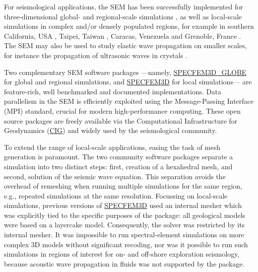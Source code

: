 \documentclass[referee,extra]{gji}
\begin{document}
For seismological applications, the SEM has been successfully implemented for three-dimensional
global- and regional-scale simulations
\citep{KoVi98,PaFaMa99,Ch00,KoTr02a,KoTr02b,CaChViMo03,ChVa04,FiIgBuKe09},
as well as local-scale simulations in complex and/or densely populated regions, for example in southern California, USA \citep{KoLiTrSuStSh04,TaLiMaTr09,TaLiMaTr2010},
Taipei, Taiwan \citep{LeChLiKoHuTr08,LeChKoHuTr09,LeKoHuTr09},
Caracas, Venezuela \citep{DeCuFeVi06}
and Grenoble, France \citep{CCGCK05,StPaIg09,ChMoTsBaKrKaStKr10}.
The SEM may also be used to study elastic wave propagation on smaller scales, for instance the propagation of ultrasonic waves in crystals \citep{WiKoScTr04}.

Two complementary SEM software packages ---namely,
\href{http://www.geodynamics.org/cig/software/specfem3d-globe}{SPECFEM3D\_GLOBE} for global and regional simulations, and \href{http://www.geodynamics.org/cig/software/specfem3d}{SPECFEM3D} for local simulations---
are feature-rich, well benchmarked and documented implementations.
Data parallelism in the SEM is efficiently exploited using the
Message-Passing Interface (MPI) standard, crucial for modern high-performance computing.
These open source packages are freely available via the Computational Infrastructure for Geodynamics
(\href{http://www.geodynamics.org}{CIG}) and widely used by the seismological community.

To extend the range of local-scale applications, easing the task of mesh generation is paramount.
The two community software packages separate a simulation into two distinct steps: first, creation of a hexahedral mesh, and
second, solution of the seismic wave equation.
This separation avoids the overhead of remeshing when running multiple simulations for the same region,
e.g., repeated simulations at the same resolution.
Focussing on local-scale simulations, previous versions of \href{http://www.geodynamics.org/cig/software/specfem3d}{SPECFEM3D} used an internal mesher which was explicitly tied to the specific purposes of the package:
all geological models were based on a layercake model.
Consequently, the solver was restricted by its internal mesher.
It was impossible to run spectral-element simulations on more complex 3D models without significant recoding, nor was it possible to run such simulations in regions of interest for on- and off-shore exploration seismology,
because acoustic wave propagation in fluids was not supported by the package.
\end{document}
